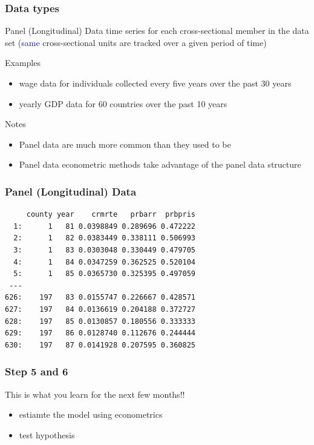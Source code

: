 \documentclass[fleqn]{beamer}\usepackage[]{graphicx}\usepackage[]{color}
\makeatletter
\newenvironment{kframe}{%
 \def\at@end@of@kframe{}%
 \ifinner\ifhmode%
  \def\at@end@of@kframe{\end{minipage}}%
  \begin{minipage}{\columnwidth}%
 \fi\fi%
 \def\FrameCommand##1{\hskip\@totalleftmargin \hskip-\fboxsep
 \colorbox{shadecolor}{##1}\hskip-\fboxsep
     \hskip-\linewidth \hskip-\@totalleftmargin \hskip\columnwidth}%
 \MakeFramed {\advance\hsize-\width
   \@totalleftmargin\z@ \linewidth\hsize
   \@setminipage}}%
 {\par\unskip\endMakeFramed%
 \at@end@of@kframe}
\newenvironment{knitrout}{}{} %
\makeatother
\begin{document}
\begin{frame}[c]
  \frametitle{Data types}
  \begin{block}{Panel (Longitudinal) Data}
    time series for each cross-sectional member in the data set (\textcolor{blue}{same} cross-sectional units are tracked over a given period of time)
  \end{block}
  \begin{block}{Examples}
    \begin{itemize}
      \item wage data for individuals collected every five years over the past 30 years
      \item yearly GDP data for 60 countries over the past 10 years
    \end{itemize}
  \end{block}
  \begin{block}{Notes}
    \begin{itemize}
     \item Panel data are much more common than they used to be
     \item Panel data econometric methods take advantage of the panel data structure
  \end{itemize}
  \end{block}
\end{frame}

\begin{frame}[c,fragile]
  \frametitle{Panel (Longitudinal) Data}
\begin{knitrout}
\color{fgcolor}\begin{kframe}
\begin{verbatim}
     county year    crmrte   prbarr  prbpris
  1:      1   81 0.0398849 0.289696 0.472222
  2:      1   82 0.0383449 0.338111 0.506993
  3:      1   83 0.0303048 0.330449 0.479705
  4:      1   84 0.0347259 0.362525 0.520104
  5:      1   85 0.0365730 0.325395 0.497059
 ---                                        
626:    197   83 0.0155747 0.226667 0.428571
627:    197   84 0.0136619 0.204188 0.372727
628:    197   85 0.0130857 0.180556 0.333333
629:    197   86 0.0128740 0.112676 0.244444
630:    197   87 0.0141928 0.207595 0.360825
\end{verbatim}
\end{kframe}
\end{knitrout}
\end{frame}

\begin{frame}[c]
  \frametitle{Step 5 and 6}
  This is what you learn for the next few months!!
  \begin{itemize}
    \item estiamte the model using econometrics
    \item test hypothesis
  \end{itemize}
\end{frame}
\end{document}
